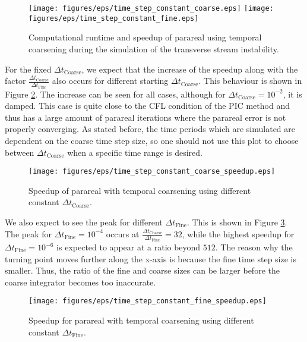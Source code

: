  \begin{figure}[h]
    \centering
    \texttt{[image: figures/eps/time\_step\_constant\_coarse.eps]}
    \texttt{[image: figures/eps/time\_step\_constant\_fine.eps]}
    \caption{Computational runtime and speedup of parareal using temporal coarsening during the simulation of the transverse stream instability.}
    \label{fig: temporal-coarsening}
\end{figure}
For the fixed $\Delta t_\mathrm{Coarse}$, we expect that the increase of the speedup along with the factor $\frac{\Delta t_\mathrm{Coarse}}{\Delta t_\mathrm{Fine}}$ also occurs for different starting $\Delta t_\mathrm{Coarse}$. This behaviour is shown in Figure \ref{fig: temporal-coarsening-speedup_coarse_const}. The increase can be seen for all cases, although for $\Delta t_\mathrm{Coarse} = 10^{-2}$, it is damped. This case is quite close to the CFL condition of the PIC method and thus has a large amount of parareal iterations where the parareal error is not properly converging. As stated before, the time periods which are simulated are dependent on the coarse time step size, so one should not use this plot to choose between $\Delta t_\mathrm{Coarse}$ when a specific time range is desired.
 \begin{figure}[h]
    \centering
    \texttt{[image: figures/eps/time\_step\_constant\_coarse\_speedup.eps]}
    \caption{Speedup of parareal with temporal coarsening using different constant $\Delta t_\mathrm{Coarse}$.}
    \label{fig: temporal-coarsening-speedup_coarse_const}
\end{figure}
We also expect to see the peak for different $\Delta t_\mathrm{Fine}$. This is shown in Figure \ref{fig: temporal-coarsening-speedup_fine_const}. The peak for $\Delta t_\mathrm{Fine} =10^{-4}$ occurs at $\frac{\Delta t_\mathrm{Coarse}}{\Delta t_\mathrm{Fine}} = 32$, while the highest speedup for $\Delta t_\mathrm{Fine} = 10^{-6}$ is expected to appear at a ratio beyond $512$. The reason why the turning point moves further along the x-axis is because the fine time step size is smaller. Thus, the ratio of the fine and coarse sizes can be larger before the coarse integrator becomes too inaccurate.
 \begin{figure}[h]
    \centering
    \texttt{[image: figures/eps/time\_step\_constant\_fine\_speedup.eps]}
    \caption{Speedup for parareal with temporal coarsening using different constant $\Delta t_\mathrm{Fine}$.}
    \label{fig: temporal-coarsening-speedup_fine_const}
\end{figure}

